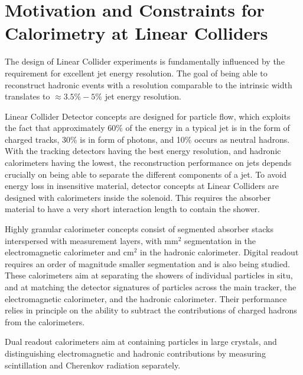 \section{Motivation and Constraints for Calorimetry at Linear Colliders}

The design of Linear Collider experiments is fundamentally influenced by the requirement for excellent jet energy resolution. The goal of being able to reconstruct hadronic \PZ events with a resolution comparable to the intrinsic width translates to $\approx 3.5\%-5\%$ jet energy resolution.

Linear Collider Detector concepts are designed for particle flow, which exploits the fact that approximately 60\% of the energy in a typical jet is in the form of charged tracks, 30\% is in form of photons, and 10\% occurs as neutral hadrons. With the tracking detectors having the best energy resolution, and hadronic calorimeters having the lowest, the reconstruction performance on jets depends crucially on being able to separate the different components of a jet. To avoid energy loss in insensitive material, detector concepts at Linear Colliders are designed with calorimeters inside the solenoid. This requires the absorber material to have a very short interaction length to contain the shower.

Highly granular calorimeter concepts consist of segmented absorber stacks interspersed with measurement layers, with $\text{mm}^2$ segmentation in the electromagnetic calorimeter and $\text{cm}^2$ in the hadronic calorimeter. Digital readout requires an order of magnitude smaller segmentation and is also being studied. These calorimeters aim at separating the showers of individual particles in situ, and at matching the detector signatures of particles across the main tracker, the electromagnetic calorimeter, and the hadronic calorimeter. Their performance relies in principle on the ability to subtract the contributions of charged hadrons from the calorimeters.

Dual readout calorimeters aim at containing particles in large crystals, and distinguishing electromagnetic and hadronic contributions by measuring scintillation and Cherenkov radiation separately.
